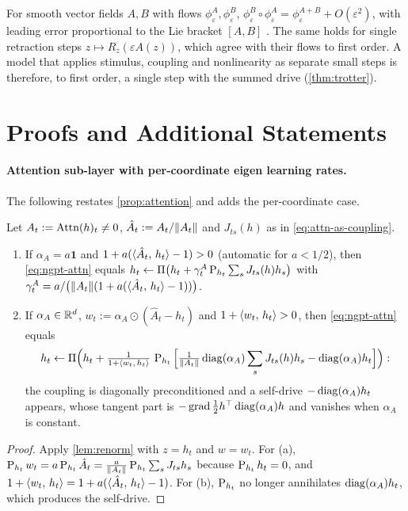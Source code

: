 For smooth vector fields $A,B$ with flows $\phi^A_\varepsilon,\phi^B_\varepsilon$,
$\phi^B_\varepsilon\circ\phi^A_\varepsilon=\phi^{A+B}_\varepsilon+O(\varepsilon^2)$, with leading
error proportional to the Lie bracket $[A,B]$ \citep{trotter1959}. The same holds for single
retraction steps $z\mapsto R_z(\varepsilon A(z))$, which agree with their flows to first order. A model
that applies stimulus, coupling and nonlinearity as separate small steps is therefore, to first order,
a single step with the summed drive (\cref{thm:trotter}).

\section{Proofs and Additional Statements}
\label{app:proofs}

\paragraph{Attention sub-layer with per-coordinate eigen learning rates.}
The following restates \cref{prop:attention} and adds the per-coordinate case.

\begin{proposition}
\label{prop:attention-full}
Let $A_t:=\operatorname{Attn}(h)_t\neq0$, $\hat A_t:=A_t/\lVert A_t\rVert$ and $J_{ts}(h)$ as in \eqref{eq:attn-as-coupling}.
\begin{enumerate}
  \item[(a)] If $\alpha_A=a\mathbf1$ and $1+a(\langle \hat A_t,\, h_t\rangle-1)>0$ (automatic for $a<1/2$), then
  \eqref{eq:ngpt-attn} equals
  $h_t\leftarrow\Pi\big(h_t+\gamma^A_t\operatorname{P}_{h_t}\sum_sJ_{ts}(h)h_s\big)$ with
  $\gamma^A_t=a/\big(\lVert A_t\rVert(1+a(\langle \hat A_t,\, h_t\rangle-1))\big)$.
  \item[(b)] If $\alpha_A\in\mathbb{R}^d$, $w_t:=\alpha_A\odot(\hat A_t-h_t)$ and $1+\langle w_t,\, h_t\rangle>0$, then
  \eqref{eq:ngpt-attn} equals
  \begin{equation}
    h_t\leftarrow\Pi\Big(h_t+\tfrac{1}{1+\langle w_t,\, h_t\rangle}\,\operatorname{P}_{h_t}\Big[\tfrac{1}{\lVert A_t\rVert}\operatorname{diag}(\alpha_A)\sum_sJ_{ts}(h)h_s-\operatorname{diag}(\alpha_A)h_t\Big]\Big):
  \end{equation}
  the coupling is diagonally preconditioned and a self-drive $-\operatorname{diag}(\alpha_A)h_t$ appears, whose
  tangent part is $-\operatorname{grad}\tfrac12h^\top\operatorname{diag}(\alpha_A)h$ and vanishes when $\alpha_A$ is constant.
\end{enumerate}
\end{proposition}
\begin{proof}
Apply \cref{lem:renorm} with $z=h_t$ and $w=w_t$. For (a),
$\operatorname{P}_{h_t}w_t=a\operatorname{P}_{h_t}\hat A_t=\tfrac{a}{\lVert A_t\rVert}\operatorname{P}_{h_t}\sum_sJ_{ts}h_s$ because
$\operatorname{P}_{h_t}h_t=0$, and $1+\langle w_t,\, h_t\rangle=1+a(\langle \hat A_t,\, h_t\rangle-1)$. For (b), $\operatorname{P}_{h_t}$ no longer
annihilates $\operatorname{diag}(\alpha_A)h_t$, which produces the self-drive.
\end{proof}


